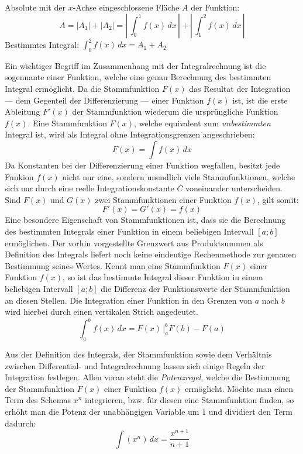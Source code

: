 Absolute mit der $x$-Achse eingeschlossene Fl\"{a}che $A$ der Funktion: $$A = |A_1| + |A_2| = \left|\,\int_{0}^{1}f(x)\,dx\,\right| + \left|\,\int_{1}^{2}f(x)\,dx\,\right|$$ Bestimmtes Integral: $\int_{0}^{2} f(x)\,dx = A_1 + A_2$

\pagebreak


Ein wichtiger Begriff im Zusammenhang mit der Integralrechnung ist die sogennante  einer Funktion, welche eine genau Berechnung des bestimmten Integral erm\"{o}glicht. Da die Stammfunktion $F(x)$ das Resultat der Integration --- dem Gegenteil der Differenzierung --- einer Funktion $f(x)$ ist, ist die erste Ableitung $F'(x)$ der Stammfunktion wiederum die urspr\"{u}ngliche Funktion $f(x)$. Eine Stammfunktion $F(x)$, welche equivalent zum \emph{unbestimmten} Integral ist, wird als Integral ohne Integrationsgrenzen angeschrieben: $$F(x) = \int f(x)\,dx$$ Da Konstanten bei der Differenzierung einer Funktion wegfallen, besitzt jede Funkion $f(x)$ nicht nur eine, sondern unendlich viele Stammfunktionen, welche sich nur durch eine reelle Integrationskonstante $C$ voneinander unterscheiden. Sind $F(x)$ und $G(x)$ zwei Stammfunktionen einer Funktion $f(x)$, gilt somit: $$F'(x) = G'(x) = f(x)$$ Eine besondere Eigenschaft von Stammfunktionen ist, dass sie die Berechnung des bestimmten Integrals einer Funktion in einem beliebigen Intervall $[a ; b]$ erm\"{o}glichen. Der vorhin vorgestellte Grenzwert aus Produktsummen als Definition des Integrals liefert noch keine eindeutige Rechenmethode zur genauen Bestimmung seines Wertes. Kennt man eine Stammfunktion $F(x)$ einer Funktion $f(x)$, so ist das bestimmte Integral dieser Funktion in einem beliebigen Intervall $[a ; b]$ die Differenz der Funktionswerte der Stammfunktion an diesen Stellen. Die Integration einer Funktion in den Grenzen von $a$ nach $b$ wird hierbei durch einen vertikalen Strich angedeutet. $$\int_a^b f(x) \, dx = F(x) \, \Big|_a^b F(b) - F(a)$$


Aus der Definition des Integrals, der Stammfunktion sowie dem Verh\"{a}ltnis zwischen Differential- und Integralrechnung lassen sich einige Regeln der Integration festlegen. Allen voran steht die \emph{Potenzregel}, welche die Bestimmung der Stammfunktion $F(x)$ einer Funktion $f(x)$ erm\"{o}glicht. M\"{o}chte man einen Term des Schemas $x^n$ integrieren, bzw. f\"{u}r diesen eine Stammfunktion finden, so erh\"{o}ht man die Potenz der unabh\"{a}ngigen Variable um $1$ und dividiert den Term dadurch: $$\int (x^n) \, dx = \frac{x^{n + 1}}{n + 1}$$

